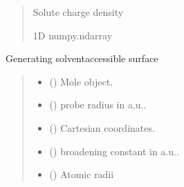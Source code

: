 \documentclass[letterpaper,10pt,english]{sphinxmanual}
\begin{document}
\begin{fulllineitems}
\begin{fulllineitems}
\begin{quote}
\begin{description}
\sphinxAtStartPar
Solute charge density

\sphinxAtStartPar
1D numpy.ndarray

\end{description}\end{quote}

\end{fulllineitems}


\begin{fulllineitems}
\label{\detokenize{fcdft.solvent:fcdft.solvent.pbe.PBE.make_sas}}
\pysigstartsignatures
\pysiglinewithargsret
{}
{\sphinxparamcomma {}\sphinxparamcomma {}\sphinxparamcomma {}\sphinxparamcomma {}}
{}
\pysigstopsignatures
\sphinxAtStartPar
Generating solvent\sphinxhyphen{}accessible surface
\begin{quote}\begin{description}
\begin{itemize}
\item {} 
\sphinxAtStartPar
{} () \textendash{} Mole object.

\item {} 
\sphinxAtStartPar
{} () \textendash{} probe radius in a.u..

\item {} 
\sphinxAtStartPar
{} () \textendash{} Cartesian coordinates.

\item {} 
\sphinxAtStartPar
{} () \textendash{} broadening constant in a.u..

\item {} 
\sphinxAtStartPar
{} () \textendash{} Atomic radii


\end{itemize}
\end{description}
\end{quote}
\end{fulllineitems}
\end{fulllineitems}
\end{document}
